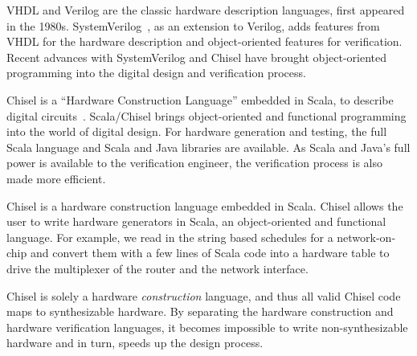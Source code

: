 \documentclass[conference]{IEEEtran}
\begin{document}

VHDL and Verilog are the classic hardware description languages, first appeared in the 1980s.
SystemVerilog~\cite{SystemVerilog}, as an extension to Verilog, adds features from VHDL
for the hardware description and object-oriented features for verification.
Recent advances with SystemVerilog and Chisel \cite{chisel:dac2012, chisel:book} have
brought object-oriented programming into the digital design and verification process.

Chisel is a ``Hardware Construction Language'' embedded in Scala, to describe digital circuits~\cite{chisel:dac2012}.
Scala/Chisel brings object-oriented and functional programming into the world of digital design.
For hardware generation and testing, the full Scala language and Scala and Java libraries are available.
As Scala and Java's full power is available to the verification engineer,
the verification process is also made more efficient.


Chisel is a hardware construction language embedded in Scala.
Chisel allows the user to write hardware generators in Scala, an object-oriented and functional language.
For example, we read in the string based schedules for a network-on-chip
and convert them with a few lines of Scala code into a hardware table to
drive the multiplexer of the router and the network interface.

Chisel is solely a hardware \emph{construction} language, and thus all valid Chisel code
maps to synthesizable hardware.
By separating the hardware construction and hardware verification languages,
it becomes impossible to write non-synthesizable hardware and in turn, speeds up the design process.
\end{document}
